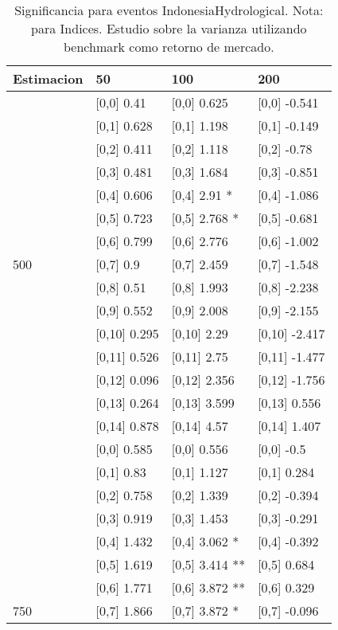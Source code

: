 \begin{table}

\caption{Significancia para eventos IndonesiaHydrological. Nota: para Indices. Estudio sobre la varianza utilizando benchmark como retorno de mercado.}
\centering
\begin{tabular}[t]{llll}
\toprule
Estimacion & 50 & 100 & 200\\
\midrule
 & {}[0,0] 0.41 & {}[0,0] 0.625 & {}[0,0] -0.541\\
 & {}[0,1] 0.628 & {}[0,1] 1.198 & {}[0,1] -0.149\\
 & {}[0,2] 0.411 & {}[0,2] 1.118 & {}[0,2] -0.78\\
 & {}[0,3] 0.481 & {}[0,3] 1.684 & {}[0,3] -0.851\\
 & {}[0,4] 0.606 & {}[0,4] 2.91 * & {}[0,4] -1.086\\
\addlinespace
 & {}[0,5] 0.723 & {}[0,5] 2.768 * & {}[0,5] -0.681\\
 & {}[0,6] 0.799 & {}[0,6] 2.776 & {}[0,6] -1.002\\
500 & {}[0,7] 0.9 & {}[0,7] 2.459 & {}[0,7] -1.548\\
 & {}[0,8] 0.51 & {}[0,8] 1.993 & {}[0,8] -2.238\\
 & {}[0,9] 0.552 & {}[0,9] 2.008 & {}[0,9] -2.155\\
\addlinespace
 & {}[0,10] 0.295 & {}[0,10] 2.29 & {}[0,10] -2.417\\
 & {}[0,11] 0.526 & {}[0,11] 2.75 & {}[0,11] -1.477\\
 & {}[0,12] 0.096 & {}[0,12] 2.356 & {}[0,12] -1.756\\
 & {}[0,13] 0.264 & {}[0,13] 3.599 & {}[0,13] 0.556\\
 & {}[0,14] 0.878 & {}[0,14] 4.57 & {}[0,14] 1.407\\
\addlinespace
 & {}[0,0] 0.585 & {}[0,0] 0.556 & {}[0,0] -0.5\\
 & {}[0,1] 0.83 & {}[0,1] 1.127 & {}[0,1] 0.284\\
 & {}[0,2] 0.758 & {}[0,2] 1.339 & {}[0,2] -0.394\\
 & {}[0,3] 0.919 & {}[0,3] 1.453 & {}[0,3] -0.291\\
 & {}[0,4] 1.432 & {}[0,4] 3.062 * & {}[0,4] -0.392\\
\addlinespace
 & {}[0,5] 1.619 & {}[0,5] 3.414 ** & {}[0,5] 0.684\\
 & {}[0,6] 1.771 & {}[0,6] 3.872 ** & {}[0,6] 0.329\\
750 & {}[0,7] 1.866 & {}[0,7] 3.872 * & {}[0,7] -0.096\\

\end{tabular}
\end{table}
